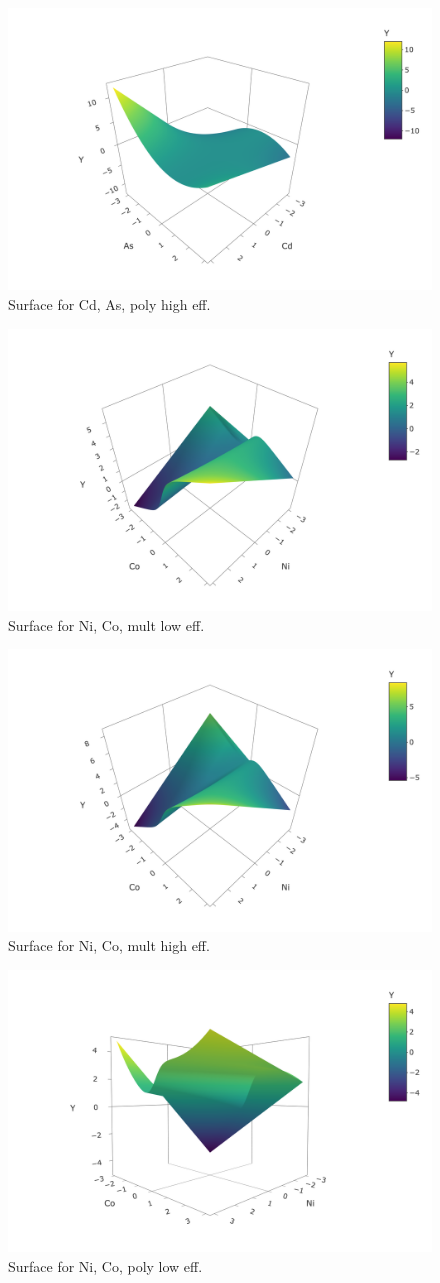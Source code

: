 \documentclass[12pt, twoside]{amherstthesis}
\begin{document}
\begin{figure}

{\centering \includegraphics[width=0.5\linewidth]{figures/surfaces/bp2} 

}

\caption{Surface for Cd, As, poly high eff.}\label{fig:bp2}
\end{figure}
\begin{figure}

{\centering \includegraphics[width=0.5\linewidth]{figures/surfaces/cm1} 

}

\caption{Surface for Ni, Co, mult low eff.}\label{fig:cm1}
\end{figure}
\begin{figure}

{\centering \includegraphics[width=0.5\linewidth]{figures/surfaces/cm2} 

}

\caption{Surface for Ni, Co, mult high eff.}\label{fig:cm2}
\end{figure}
\begin{figure}

{\centering \includegraphics[width=0.5\linewidth]{figures/surfaces/cp1} 

}

\caption{Surface for Ni, Co, poly low eff.}\label{fig:cp1}
\end{figure}
\end{document}
